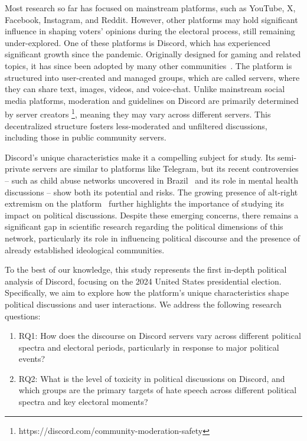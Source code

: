 Most research so far has focused on mainstream platforms, such as YouTube, X, Facebook, Instagram, and Reddit. However, other platforms may hold significant influence in shaping voters' opinions during the electoral process, still remaining under-explored. 
One of these platforms is Discord, which has experienced significant growth since the pandemic. Originally designed for gaming and related topics, it has since been adopted by many other communities~\cite{johnson2022embracing}.
The platform is structured into user-created and managed groups, which are called servers, where they can share text, images, videos, and voice-chat. 
Unlike mainstream social media platforms, moderation and guidelines on Discord are primarily determined by server creators \footnote{https://discord.com/community-moderation-safety}, meaning they may vary across different servers. This decentralized structure fosters less-moderated and unfiltered discussions, including those in public community servers.

Discord's unique characteristics make it a compelling subject for study. Its semi-private servers are similar to platforms like Telegram, but its recent controversies -- such as child abuse networks uncovered in Brazil~\cite{discord2024scandalbrazil} and its role in mental health discussions \cite{webmedia} -- show both its potential and risks. The growing presence of alt-right extremism on the platform~\cite{gallagher2021extreme} further highlights the importance of studying its impact on political discussions. Despite these emerging concerns, there remains a significant gap in scientific research regarding the political dimensions of this network, particularly  its role in influencing political discourse and the presence of already established ideological communities.
    
To the best of our knowledge, this study represents the first in-depth political analysis of Discord, focusing on the 2024 United States presidential election. Specifically, we aim to explore how the platform's unique characteristics shape political discussions and user interactions. We address the following research questions:

\begin{enumerate}
    \item RQ1: How does the discourse on Discord servers vary across different political spectra and electoral periods, particularly in response to major political events? 
    \item RQ2: What is the level of toxicity in political discussions on Discord, and which groups are the primary targets of hate speech across different political spectra and key electoral moments?
\end{enumerate}

